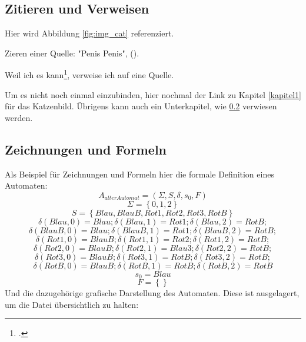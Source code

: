 \documentclass[../main.tex]{subfiles}
\begin{document}
\subsection{Zitieren und Verweisen}
\label{zitieren_und_verweisen}
Hier wird Abbildung \ref{fig:img_cat} referenziert.

Zieren einer Quelle: "Penis Penis", (\cite[Seite 11]{theoretischeinformatik}).

Weil ich es kann\footcite{spektumperformance}, verweise ich auf eine Quelle.

Um es nicht noch einmal einzubinden, hier nochmal der Link zu Kapitel \ref{kapitel1} für das Katzenbild. Übrigens kann auch ein Unterkapitel, wie \ref{zeichnungen_und_formeln} verwiesen werden.

\subsection{Zeichnungen und Formeln}
\label{zeichnungen_und_formeln}
Als Beispiel für Zeichnungen und Formeln hier die formale Definition eines Automaten:
$$A_{alterAutomat} = (\Sigma, S, \delta, s_{0}, F)$$
$$\Sigma = \left\{0, 1, 2\right\}$$
$$S = \left\{Blau, BlauB, Rot1, Rot2, Rot3, RotB\right\}$$
$$\delta(Blau, 0) = Blau; \delta(Blau, 1) = Rot1; \delta(Blau, 2) = RotB;$$
$$\delta(BlauB, 0) = Blau; \delta(BlauB, 1) = Rot1; \delta(BlauB, 2) = RotB;$$
$$\delta(Rot1, 0) = BlauB; \delta(Rot1, 1) = Rot2; \delta(Rot1, 2) = RotB;$$
$$\delta(Rot2, 0) = BlauB; \delta(Rot2, 1) = Blau3; \delta(Rot2, 2) = RotB;$$
$$\delta(Rot3, 0) = BlauB; \delta(Rot3, 1) = RotB; \delta(Rot3, 2) = RotB;$$
$$\delta(RotB, 0) = BlauB; \delta(RotB, 1) = RotB; \delta(RotB, 2) = RotB$$
$$s_{0} = Blau$$
$$F = \left\{\right\}$$
Und die dazugehörige grafische Darstellung des Automaten. Diese ist ausgelagert, um die Datei übersichtlich zu halten:


\end{document}
